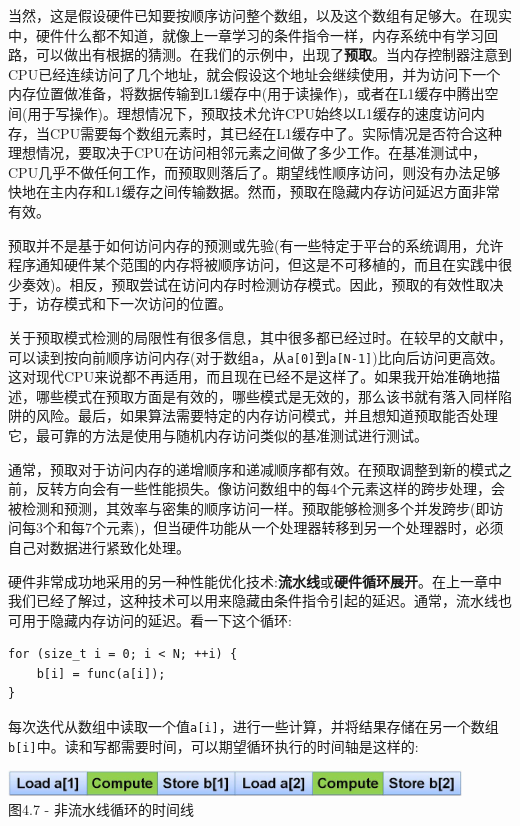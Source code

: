当然，这是假设硬件已知要按顺序访问整个数组，以及这个数组有足够大。在现实中，硬件什么都不知道，就像上一章学习的条件指令一样，内存系统中有学习回路，可以做出有根据的猜测。在我们的示例中，出现了\textbf{预取}。当内存控制器注意到CPU已经连续访问了几个地址，就会假设这个地址会继续使用，并为访问下一个内存位置做准备，将数据传输到L1缓存中(用于读操作)，或者在L1缓存中腾出空间(用于写操作)。理想情况下，预取技术允许CPU始终以L1缓存的速度访问内存，当CPU需要每个数组元素时，其已经在L1缓存中了。实际情况是否符合这种理想情况，要取决于CPU在访问相邻元素之间做了多少工作。在基准测试中，CPU几乎不做任何工作，而预取则落后了。期望线性顺序访问，则没有办法足够快地在主内存和L1缓存之间传输数据。然而，预取在隐藏内存访问延迟方面非常有效。

预取并不是基于如何访问内存的预测或先验(有一些特定于平台的系统调用，允许程序通知硬件某个范围的内存将被顺序访问，但这是不可移植的，而且在实践中很少奏效)。相反，预取尝试在访问内存时检测访存模式。因此，预取的有效性取决于，访存模式和下一次访问的位置。

关于预取模式检测的局限性有很多信息，其中很多都已经过时。在较早的文献中，可以读到按向前顺序访问内存(对于数组\texttt{a}，从\texttt{a[0]}到\texttt{a[N-1]})比向后访问更高效。这对现代CPU来说都不再适用，而且现在已经不是这样了。如果我开始准确地描述，哪些模式在预取方面是有效的，哪些模式是无效的，那么该书就有落入同样陷阱的风险。最后，如果算法需要特定的内存访问模式，并且想知道预取能否处理它，最可靠的方法是使用与随机内存访问类似的基准测试进行测试。

通常，预取对于访问内存的递增顺序和递减顺序都有效。在预取调整到新的模式之前，反转方向会有一些性能损失。像访问数组中的每4个元素这样的跨步处理，会被检测和预测，其效率与密集的顺序访问一样。预取能够检测多个并发跨步(即访问每3个和每7个元素)，但当硬件功能从一个处理器转移到另一个处理器时，必须自己对数据进行紧致化处理。

硬件非常成功地采用的另一种性能优化技术:\textbf{流水线}或\textbf{硬件循环展开}。在上一章中我们已经了解过，这种技术可以用来隐藏由条件指令引起的延迟。通常，流水线也可用于隐藏内存访问的延迟。看一下这个循环:

\begin{lstlisting}[style=styleCXX]
for (size_t i = 0; i < N; ++i) {
	b[i] = func(a[i]);
}
\end{lstlisting}

每次迭代从数组中读取一个值\texttt{a[i]}，进行一些计算，并将结果存储在另一个数组\texttt{b[i]}中。读和写都需要时间，可以期望循环执行的时间轴是这样的:

\begin{center}
\includegraphics[width=0.9\textwidth]{content/1/chapter4/images/7.jpg}\\
图4.7 - 非流水线循环的时间线
\end{center}

